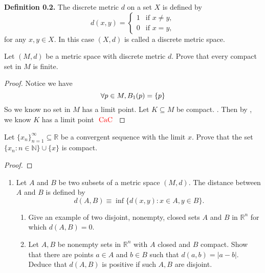 \documentclass{report}
\begin{document}
\textbf{Definition 0.2.} The discrete metric \( d \) on a set \( X \) is defined by
\[
d(x,y) = 
\begin{cases} 
1 & \text{if } x \neq y, \\
0 & \text{if } x = y,
\end{cases}
\]
for any \( x, y \in X \). In this case \( (X,d) \) is called a discrete metric space.
\begin{question}{}{}

Let \( (M, d) \) be a metric space with discrete metric \( d \). Prove that every compact set in \( M \) is finite.
\end{question}
\begin{proof}
Notice we have
\begin{equation}
\forall p\in M, B_1(p)=\{ p \}
\end{equation}
So we know no set in $M$ has a limit point. Let $K\subseteq M$ be compact. . Then by , we know $K$ has a limit point $\text{ \textcolor{red}{CaC} }$  
\end{proof}
\begin{question}{}{}

Let \( \{ x_n \}_{n=1}^{\infty} \subseteq \mathbb{R} \) be a convergent sequence with the limit \( x \). Prove that the set \( \{ x_n : n \in \mathbb{N} \} \cup \{ x \} \) is compact.
\end{question}
\begin{proof}

\end{proof}
\begin{question}{}{}

\begin{enumerate}
    \item Let \( A \) and \( B \) be two subsets of a metric space \( (M,d) \). The distance between \( A \) and \( B \) is defined by
    \[
    d(A,B) \equiv \inf\{d(x,y) : x \in A, y \in B\}.
    \]
    \begin{enumerate}
        \item Give an example of two disjoint, nonempty, closed sets \( A \) and \( B \) in \( \mathbb{R}^n \) for which \( d(A, B) = 0 \).
        \item Let \( A, B \) be nonempty sets in \( \mathbb{R}^n \) with \( A \) closed and \( B \) compact. Show that there are points \( a \in A \) and \( b \in B \) such that \( d(a, b) = |a-b| \). Deduce that \( d(A, B) \) is positive if such \( A, B \) are disjoint.
    \end{enumerate}
\end{enumerate}
\end{question}
\end{document}
